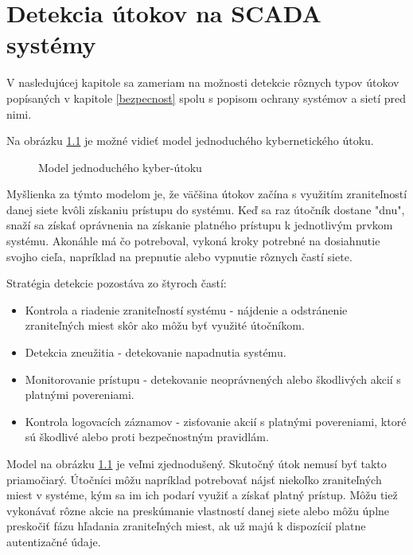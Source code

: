 \chapter{Detekcia útokov na SCADA systémy}
\tab V nasledujúcej kapitole sa zameriam na možnosti detekcie rôznych typov útokov popísaných v kapitole \ref{bezpecnost} spolu s popisom ochrany systémov a sietí pred nimi. \par
Na obrázku \ref{attack} je možné vidieť model jednoduchého kybernetického útoku.
\begin{figure}[h]
    \centering
    \caption{Model jednoduchého kyber-útoku}
\label{attack}
\end{figure}
Myšlienka za týmto modelom je, že väčšina útokov začína s využitím zraniteľností danej siete kvôli získaniu prístupu do systému. Keď sa raz útočník dostane "dnu", snaží sa získať oprávnenia na získanie platného prístupu k jednotlivým prvkom systému. Akonáhle má čo potreboval, vykoná kroky potrebné na dosiahnutie svojho cieľa, napríklad na prepnutie alebo vypnutie rôznych častí siete. \par
Stratégia detekcie pozostáva zo štyroch častí:
\begin{itemize}
\item Kontrola a riadenie zraniteľností systému - nájdenie a odstránenie zraniteľných miest skôr ako môžu byť využité útočníkom.
\item Detekcia zneužitia - detekovanie napadnutia systému.
\item Monitorovanie prístupu - detekovanie neoprávnených alebo škodlivých akcií s platnými povereniami.
\item Kontrola logovacích záznamov - zisťovanie akcií s platnými povereniami, ktoré sú škodlivé alebo proti bezpečnostným pravidlám.
\end{itemize}
Model na obrázku \ref{attack} je veľmi zjednodušený. Skutočný útok nemusí byť takto priamočiarý. Útočníci môžu napríklad potrebovať nájsť niekoľko zraniteľných miest v systéme, kým sa im ich podarí využiť a získať platný prístup. Môžu tiež vykonávať rôzne akcie na preskúmanie vlastností danej siete alebo môžu úplne preskočiť fázu hľadania zraniteľných miest, ak už majú k dispozícií platne autentizačné údaje\cite{Security}\cite{IoTSec}.


